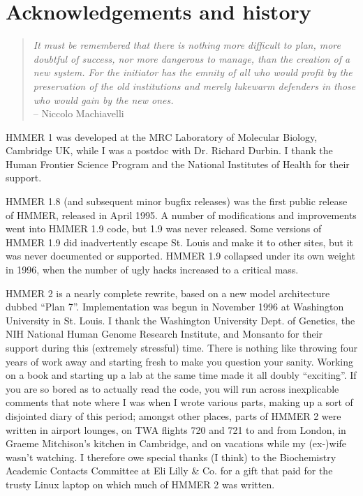 \chapter {Acknowledgements and history}

\begin{quote}
\textit{
It must be remembered that there is nothing more difficult to plan, more
doubtful of success, nor more dangerous to manage, than the creation of
a new system.  For the initiator has the emnity of all who would profit
by the preservation of the old institutions and merely lukewarm defenders
in those who would gain by the new ones.\\}
\hspace*{\fill} -- Niccolo Machiavelli
\end{quote}

HMMER 1 was developed at the MRC Laboratory of Molecular Biology,
Cambridge UK, while I was a postdoc with Dr. Richard Durbin. I thank
the Human Frontier Science Program and the National Institutes of
Health for their support. 

HMMER 1.8 (and subsequent minor bugfix releases) was the first public
release of HMMER, released in April 1995. A number of modifications
and improvements went into HMMER 1.9 code, but 1.9 was never
released. Some versions of HMMER 1.9 did inadvertently escape
St. Louis and make it to other sites, but it was never documented or
supported. HMMER 1.9 collapsed under its own weight in 1996, when the
number of ugly hacks increased to a critical mass.

HMMER 2 is a nearly complete rewrite, based on a new model
architecture dubbed ``Plan 7''. Implementation was begun in November
1996 at Washington University in St. Louis. I thank the Washington
University Dept. of Genetics, the NIH National Human Genome Research
Institute, and Monsanto for their support during this (extremely
stressful) time. There is nothing like throwing four years of work
away and starting fresh to make you question your sanity. Working on a
book \cite{Durbin98} and starting up a lab at the same time made it
all doubly ``exciting''. If you are so bored as to actually read the
code, you will run across inexplicable comments that note where I was
when I wrote various parts, making up a sort of disjointed diary of
this period; amongst other places, parts of HMMER 2 were written in
airport lounges, on TWA flights 720 and 721 to and from London, in
Graeme Mitchison's kitchen in Cambridge, and on vacations while my
(ex-)wife wasn't watching. I therefore owe special thanks (I think) to
the Biochemistry Academic Contacts Committee at Eli Lilly \& Co. for a
gift that paid for the trusty Linux laptop on which much of HMMER 2
was written.

